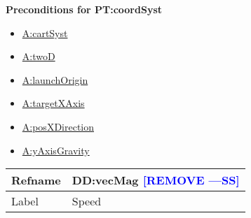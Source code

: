 \documentclass[12pt]{article}
\newcommand{\authornote}[3]{\textcolor{#1}{[#3 ---#2]}}
\newcommand{\authornote}[3]{}
\newcommand{\wss}[1]{\authornote{blue}{SS}{#1}}
\begin{document}
\noindent \textbf{Preconditions for PT:coordSyst}

\begin{itemize}
\item \hyperref[cartSyst]{A:cartSyst}
\item \hyperref[twoD]{A:twoD}
\item \hyperref[launchOrigin]{A:launchOrigin}
\item \hyperref[targetXAxis]{A:targetXAxis}
\item \hyperref[posXDirection]{A:posXDirection}
\item \hyperref[yAxisGravity]{A:yAxisGravity}
\end{itemize}

\medskip
\noindent
\begin{minipage}{\textwidth}
\begin{tabular}{>{\raggedright}p{}>{\raggedright\arraybackslash}p{}}
\toprule \textbf{Refname} & \textbf{DD:vecMag} \wss{REMOVE}
\label{DD:vecMag}
\\ \midrule
Label & Speed        
\\ \bottomrule
\end{tabular}
\end{minipage}
\end{document}
